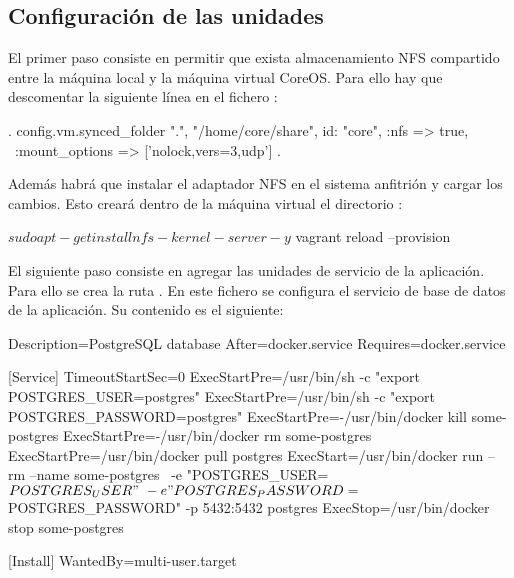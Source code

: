 \subsection{Configuración de las unidades}

El primer paso consiste en permitir que exista almacenamiento NFS compartido entre la máquina local y la máquina virtual CoreOS. Para ello hay que descomentar la siguiente línea en el fichero :

\begin{codelisting}
\label{code:vagrantfile2}
\begin{code}
.
config.vm.synced_folder ".", "/home/core/share", id: "core", :nfs => true, \
:mount_options => ['nolock,vers=3,udp']
.
\end{code}
\end{codelisting}

Además habrá que instalar el adaptador NFS en el sistema anfitrión y cargar los cambios. Esto creará dentro de la máquina virtual el directorio :

\begin{code}
$ sudo apt-get install nfs-kernel-server -y
$ vagrant reload --provision
\end{code}

El siguiente paso consiste en agregar las unidades de servicio de la aplicación. Para ello  se crea la ruta . En este fichero se configura el servicio  de base de datos de la aplicación. Su contenido es el siguiente:

\begin{codelisting}
\label{code:cloud-config2}
\begin{code}
[Unit] 
  Description=PostgreSQL database 
  After=docker.service 
  Requires=docker.service 

[Service] 
  TimeoutStartSec=0 
  ExecStartPre=/usr/bin/sh -c "export POSTGRES_USER=postgres" 
  ExecStartPre=/usr/bin/sh -c "export POSTGRES_PASSWORD=postgres" 
  ExecStartPre=-/usr/bin/docker kill some-postgres 
  ExecStartPre=-/usr/bin/docker rm some-postgres 
  ExecStartPre=/usr/bin/docker pull postgres 
  ExecStart=/usr/bin/docker run --rm --name some-postgres \
  -e "POSTGRES_USER=${POSTGRES_USER}" \
  -e "POSTGRES_PASSWORD=${POSTGRES_PASSWORD}" -p 5432:5432 postgres 
  ExecStop=/usr/bin/docker stop some-postgres 

[Install] 
  WantedBy=multi-user.target
\end{code}
\end{codelisting}

